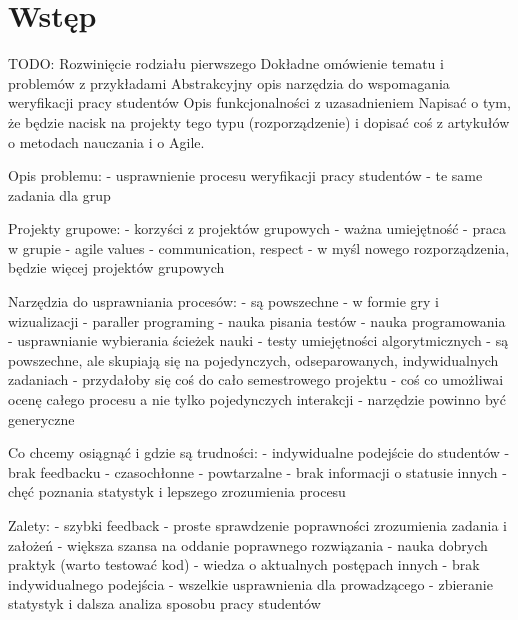 \chapter{Wstęp}
\label{intro}

TODO:
Rozwinięcie rodziału pierwszego
Dokładne omówienie tematu i problemów z przykładami
Abstrakcyjny opis narzędzia do wspomagania weryfikacji pracy studentów
Opis funkcjonalności z uzasadnieniem
Napisać o tym, że będzie nacisk na projekty tego typu (rozporządzenie) i dopisać coś z artykułów o metodach nauczania i o Agile.


Opis problemu:
	- usprawnienie procesu weryfikacji pracy studentów
	- te same zadania dla grup

Projekty grupowe:
	- korzyści z projektów grupowych
	- ważna umiejętność - praca w grupie
	- agile values - communication, respect
	- w myśl nowego rozporządzenia, będzie więcej projektów grupowych

Narzędzia do usprawniania procesów:
	- są powszechne
	- w formie gry i wizualizacji
	- paraller programing
	- nauka pisania testów
	- nauka programowania
	- usprawnianie wybierania ścieżek nauki
	- testy umiejętności algorytmicznych
	- są powszechne, ale skupiają się na pojedynczych, odseparowanych, indywidualnych zadaniach
	- przydałoby się coś do cało semestrowego projektu
	- coś co umożliwai ocenę całego procesu a nie tylko pojedynczych interakcji
	- narzędzie powinno być generyczne

Co chcemy osiągnąć i gdzie są trudności:
    - indywidualne podejście do studentów
    - brak feedbacku
    - czasochłonne
    - powtarzalne
    - brak informacji o statusie innych
    - chęć poznania statystyk i lepszego zrozumienia procesu

Zalety:
	- szybki feedback
	- proste sprawdzenie poprawności zrozumienia zadania i założeń
	- większa szansa na oddanie poprawnego rozwiązania
	- nauka dobrych praktyk (warto testować kod)
	- wiedza o aktualnych postępach innych
	- brak indywidualnego podejścia
	- wszelkie usprawnienia dla prowadzącego
	- zbieranie statystyk i dalsza analiza sposobu pracy studentów

